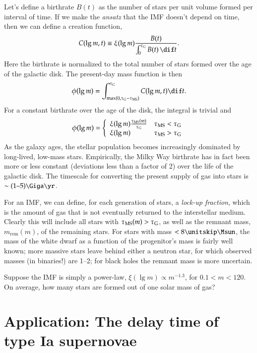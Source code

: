 Let's define a birthrate $B(t)$ as the number of stars per unit volume formed per interval of time.  If we make the \emph{ansatz} that the IMF doesn't depend on time, then we can define a creation function,
\begin{equation}\label{e.creation-fcn}
C(\lg m,t) \equiv \xi(\lg m)\frac{B(t)}{\int_{0}^{\tauG} B(t)\,\dif t}.
\end{equation}
Here the birthrate is normalized to the total number of stars formed over the age of the galactic disk. The present-day mass function is then
\[
	\phi(\lg m) = \int_{\max(0,\tauG-\tms)}^{\tauG} C(\lg m,t) \dif t.
\]
For a constant birthrate over the age of the disk, the integral is trivial and
\[
	\phi(\lg m) = \left\{\begin{array}{lr}\xi(\lg m)\frac{\tau_{\mathrm{MS}}(m)}{\tau_{\mathrm{G}}} & \tau_{\mathrm{MS}} < \tau_{\mathrm{G}} \\
		\xi(\lg m) & \tau_{\mathrm{MS}} > \tau_{\mathrm{G}}\end{array}\right.
\]
As the galaxy ages, the stellar population becomes increasingly dominated by long-lived, low-mass stars.
Empirically, the Milky Way birthrate has in fact been more or less constant (deviations less than a factor of 2) over the life of the galactic disk.  The timescale for converting the present supply of gas into stars is $\sim (1\textrm{--}5)\Giga\yr$.  

For an IMF, we can define, for each generation of stars, a \emph{lock-up fraction}, which is the amount of gas that is not eventually returned to the interstellar medium. Clearly this will include all stars with $\tau_{\mathrm{MS}}(m) > \tau_{\mathrm{G}}$, as well as the remnant mass, $m_{\mathrm{rem}}(m)$, of the remaining stars.  For stars with mass $< 8\nsp\Msun$, the mass of the white dwarf as a function of the progenitor's mass is fairly well known; more massive stars leave behind either a neutron star, for which observed masses (in binaries!) are 1--2\nsp\Msun; for black holes the remnant mass is more uncertain.

\begin{exercisebox}
Suppose the IMF is simply a power-law, $\xi(\lg m) \propto m^{-1.3}$, for $0.1 < m < 120$. On average, how many stars are formed out of one solar mass of gas?
\end{exercisebox}

\section{Application: The delay time of type Ia supernovae}\label{s.delay-time}

